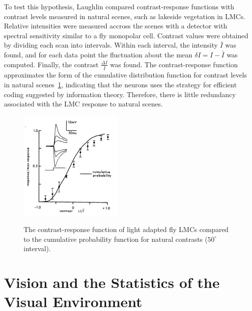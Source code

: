 \documentclass[twoside]{article}
\begin{document}
\begin{multicols}{2}
To test this hypothesis, Laughlin compared contrast-response functions with contrast levels measured in natural scenes, such as lakeside vegetation in LMCs. Relative intensities were measured accross the scenes with a detector with spectral sensitivity similar to a fly monopolar cell. Contrast values were obtained by dividing each scan into intervals. Within each interval, the intensity $\bar{I}$ was found, and for each data point the fluctuation about the mean $\delta I = I - \bar{I}$ was computed. Finally, the contrast $\displaystyle\frac{\Delta I}{\bar{I}}$ was found. The contrast-response function approximates the form of the cumulative distribution function for contrast levels in natural scenes~\ref{fig:laughlin1981-fig2}, indicating that the neurons uses the strategy for efficient coding suggested by information theory. Therefore, there is little redundancy associated with the LMC response to natural scenes. 

\begin{figure}[H]
	\caption{
		The contrast-response function of light adapted fly LMCs compared to the cumulative probability function for natural contrasts ($50^\circ$ interval).
	}
	\includegraphics[width=0.45\textwidth]{laughlin1981-fig2}
	\label{fig:laughlin1981-fig2}
\end{figure}





\section{Vision and the Statistics of the Visual Environment}


\end{multicols}
\end{document}
